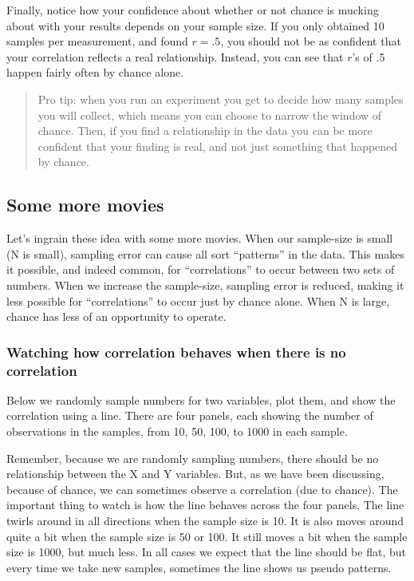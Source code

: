 \documentclass[
]{book}
\begin{document}
Finally, notice how your confidence about whether or not chance is mucking about with your results depends on your sample size. If you only obtained 10 samples per measurement, and found \(r = .5\), you should not be as confident that your correlation reflects a real relationship. Instead, you can see that \(r\)'s of .5 happen fairly often by chance alone.

\begin{quote}
Pro tip: when you run an experiment you get to decide how many samples you will collect, which means you can choose to narrow the window of chance. Then, if you find a relationship in the data you can be more confident that your finding is real, and not just something that happened by chance.
\end{quote}

\subsection{Some more movies}\label{some-more-movies}

Let's ingrain these idea with some more movies. When our sample-size is small (N is small), sampling error can cause all sort ``patterns'' in the data. This makes it possible, and indeed common, for ``correlations'' to occur between two sets of numbers. When we increase the sample-size, sampling error is reduced, making it less possible for ``correlations'' to occur just by chance alone. When N is large, chance has less of an opportunity to operate.

\subsubsection{Watching how correlation behaves when there is no correlation}\label{watching-how-correlation-behaves-when-there-is-no-correlation}

Below we randomly sample numbers for two variables, plot them, and show the correlation using a line. There are four panels, each showing the number of observations in the samples, from 10, 50, 100, to 1000 in each sample.

Remember, because we are randomly sampling numbers, there should be no relationship between the X and Y variables. But, as we have been discussing, because of chance, we can sometimes observe a correlation (due to chance). The important thing to watch is how the line behaves across the four panels. The line twirls around in all directions when the sample size is 10. It is also moves around quite a bit when the sample size is 50 or 100. It still moves a bit when the sample size is 1000, but much less. In all cases we expect that the line should be flat, but every time we take new samples, sometimes the line shows us pseudo patterns.
\end{document}
